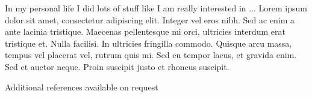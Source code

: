 
\color{body}
In my personal life I did lots of stuff like I am really interested in ...  Lorem ipsum dolor sit amet, consectetur adipiscing elit. Integer vel eros nibh. Sed ac enim a ante lacinia tristique. Maecenas pellentesque mi orci, ultricies interdum erat tristique et. Nulla facilisi. In ultricies fringilla commodo. Quisque arcu massa, tempus vel placerat vel, rutrum quis mi. Sed eu tempor lacus, et gravida enim. Sed et auctor neque. Proin suscipit justo et rhoncus suscipit.





\divider\smallskip







\divider
Additional references available on request




